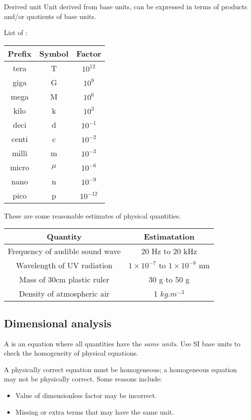 \begin{defn}{Derived unit}{}
Unit derived from base units, can be expressed in terms of products and/or quotients of base units.
\end{defn}
\pagebreak
List of :
\begin{table}[H]
	\centering
	\begin{tabular}{ccc} 
	\hline\hline
	\textbf{Prefix} & \textbf{Symbol} & \textbf{Factor} \\
	\hline
	tera & T & ${10}^{12}$ \\ 
	giga & G & ${10}^{9}$ \\
	mega & M & ${10}^{6}$ \\
	kilo & k & ${10}^{3}$ \\
	deci & d & ${10}^{-1}$ \\
	centi & c & ${10}^{-2}$ \\ 
	milli & m & ${10}^{-3}$ \\
	micro & $\mu$ & ${10}^{-6}$ \\ 
	nano & n & ${10}^{-9}$ \\
	pico & p & ${10}^{-12}$ \\
	\hline\hline
	\end{tabular}
\end{table}

These are some reasonable estimates of physical quantities.
\begin{table}[H]
	\centering
	\begin{tabular}{cc} 
	\hline\hline
	\textbf{Quantity} & \textbf{Estimatation} \\ 
	\hline
	Frequency of audible sound wave & 20 Hz to 20 kHz \\ 
	Wavelength of UV radiation & $1 \times 10^{-7}$ to $1 \times 10^{-8}$ nm \\
	Mass of 30cm plastic ruler & 30 g to 50 g \\
	Density of atmospheric air & 1 $\unit{kg.m^{-3}}$ \\
	\hline\hline
	\end{tabular}
\end{table}

\subsection{Dimensional analysis}
A  is an equation where all quantities have the \emph{same units}. Use SI base units to check the homogeneity of physical equations.

A physically correct equation must be homogeneous; a homogeneous equation may not be physically correct. Some reasons include:
\begin{itemize}
    \item Value of dimensionless factor may be incorrect.
    \item Missing or extra terms that may have the same unit.
\end{itemize}


